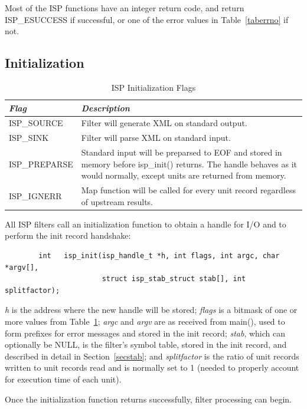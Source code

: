 \documentclass{article}
\begin{document}
Most of the ISP functions have an integer return code, and 
return ISP\_ESUCCESS if successful, or one of the error values in 
Table~\ref{taberrno} if not.

\subsection{Initialization}

\begin{table}
\begin{center}
\begin{tabular}{|l|p{4.0in}|}\hline
{\em Flag}	& {\em Description}\\
\hline
ISP\_SOURCE	& Filter will generate XML on standard output.\\
ISP\_SINK	& Filter will parse XML on standard input.\\
ISP\_PREPARSE	& Standard input will be preparsed to EOF and stored in memory
		  before isp\_init() returns.  The handle behaves as it would
		  normally, except units are returned from memory.\\
ISP\_IGNERR	& Map function will be called for every unit record regardless 
                  of upstream results.\\
\hline
\end{tabular}
\end{center}
\caption{ISP Initialization Flags}\label{tabinitflags}
\end{table}

All ISP filters call an initialization function to obtain
a handle for I/O and to perform the init record handshake:
\begin{verbatim}
        int   isp_init(isp_handle_t *h, int flags, int argc, char *argv[],
                       struct isp_stab_struct stab[], int splitfactor);
\end{verbatim}
{\em h} is the address where the new handle will be stored;
{\em flags} is a bitmask of one or more values from
Table~\ref{tabinitflags};
{\em argc} and {\em argv} are as received from main(),
used to form prefixes for error messages and stored in the init record;
{\em stab}, which can optionally be NULL, is the filter's symbol table,
stored in the init record, and described in detail in Section~\ref{secstab};
and {\em splitfactor} is the ratio of unit records written to unit records read
and is normally set to 1 (needed to properly account for execution
time of each unit).

Once the initialization function returns successfully, filter processing can 
begin.
\end{document}
